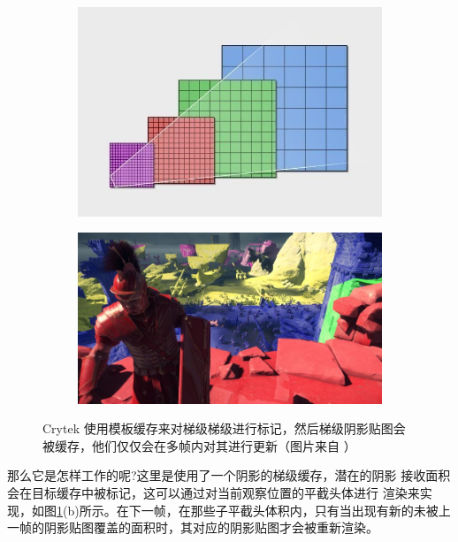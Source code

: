 \begin{figure}
\begin{fullwidth}
	\begin{subfigure}[b]{0.442\thewidth}
		\includegraphics[width=\textwidth]{figures/shadows/crytek-csms-1}	
		\caption{}
	\end{subfigure}
	\begin{subfigure}[b]{0.54\thewidth}
		\includegraphics[width=\textwidth]{figures/shadows/crytek-csms-2}	
		\caption{}
	\end{subfigure}
\caption{Crytek 使用模板缓存来对梯级梯级进行标记，然后梯级阴影贴图会被缓存，他们仅仅会在多帧内对其进行更新（图片来自 \cite{a:PlayingwithReal-TimeShadows}）}
\label{f:df-crytek-csm}
\end{fullwidth}
\end{figure}

那么它是怎样工作的呢?这里是使用了一个阴影的梯级缓存，潜在的阴影 接收面积会在目标缓存中被标记，这可以通过对当前观察位置的平截头体进行 渲染来实现，如图\ref{f:df-crytek-csm}(b)所示。在下一帧，在那些子平截头体积内，只有当出现有新的未被上一帧的阴影贴图覆盖的面积时，其对应的阴影贴图才会被重新渲染。

